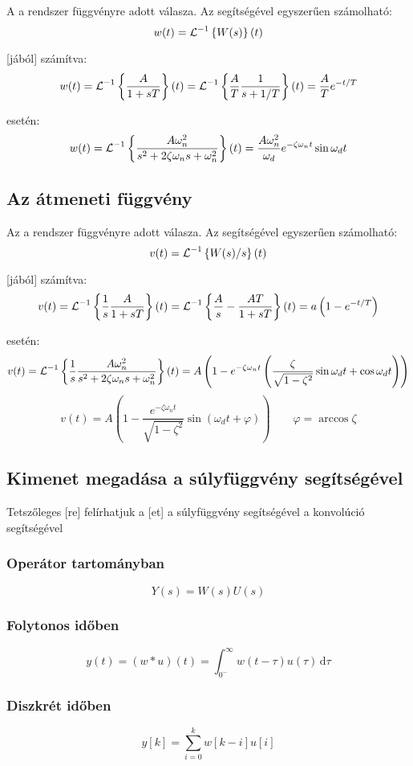 \documentclass[../main.tex]{subfiles}
\begin{document}
A  a rendszer  függvényre adott válasza.
Az  segítségével egyszerűen számolható:
\[
	w(t) = \operatorname{\mathcal{L}}^{-1} \left\{ W(s) \right\}(t)
\]

 [jából] számítva:
\[
	w(t)
	= \operatorname{\mathcal{L}}^{-1} \left\{ \frac{A}{1 + sT} \right\} (t)
	= \operatorname{\mathcal{L}}^{-1} \left\{ \frac{A}{T} \frac{1}{s + 1/T} \right\} (t)
	= \frac{A}{T} e^{-t / T}
\]

 esetén:
\[
	w(t)
	= \operatorname{\mathcal{L}}^{-1} \left\{ \frac{A \omega_n^2}{s^2 + 2 \zeta \omega_n  s + \omega_n^2} \right\} (t)
	= \frac{A \omega_n^2}{\omega_d} e^{-\zeta \omega_n t } \sin \omega_d t
\]

\subsection{Az átmeneti függvény}

Az  a rendszer  függvényre adott válasza.
Az  segítségével egyszerűen számolható:
\[
	v(t) = \operatorname{\mathcal{L}}^{-1} \left\{ W(s) / s\right\}(t)
\]

 [jából] számítva:
\[
	v(t)
	= \operatorname{\mathcal{L}}^{-1} \left\{ \frac{1}{s} \frac{A}{1 + sT} \right\} (t)
	= \operatorname{\mathcal{L}}^{-1} \left\{ \frac{A}{s} -  \frac{AT}{1 + sT} \right\} (t)
	= a \left( 1 - e^{-t/T} \right)
\]

 esetén:
\[
	v(t)
	= \operatorname{\mathcal{L}}^{-1} \left\{ \frac{1}{s} \frac{A \omega_n^2}{s^2 + 2 \zeta \omega_n  s + \omega_n^2} \right\} (t)
	= A \left( 1 - e^{-\zeta \omega_n t} \left( \frac{\zeta}{\sqrt{1 - \zeta^2}} \sin \omega_d t + \cos \omega_d t \right) \right)
\]\[
	v(t) = A \left( 1 - \frac{e^{-\zeta \omega_n t}}{\sqrt{1 - \zeta^2}} \sin \left( \omega_d t + \varphi \right) \right)
	\qquad
	\varphi = \arccos \zeta
\]

\subsection{Kimenet megadása a súlyfüggvény segítségével}

Tetszőleges [re] felírhatjuk a [et] a súlyfüggvény
segítségével a konvolúció segítségével

\subsubsection*{Operátor tartományban}
\[
	Y(s) = W(s)U(s)
\]

\subsubsection*{Folytonos időben}
\[
	y(t) = (w * u)(t) = \int_{0^-}^\infty w(t - \tau) u(\tau) \, \mathrm{d} \tau
\]

\subsubsection*{Diszkrét időben}
\[
	y[k] = \sum_{i=0}^k w [k - i] u[i]
\]
\end{document}
